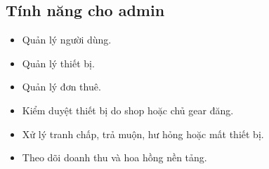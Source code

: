 \subsection{Tính năng cho admin}

\begin{itemize}
    \item Quản lý người dùng.
    \item Quản lý thiết bị.
    \item Quản lý đơn thuê.
    \item Kiểm duyệt thiết bị do shop hoặc chủ gear đăng.
    \item Xử lý tranh chấp, trả muộn, hư hỏng hoặc mất thiết bị.
    \item Theo dõi doanh thu và hoa hồng nền tảng.
\end{itemize}
